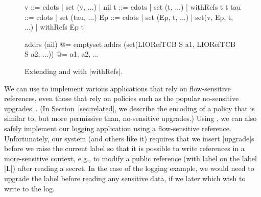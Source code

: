 \begin{figure} %
\small
\begin{code}
v    ::= cdots  | set (v, ...) | nil
t    ::= cdots  | set (t, ...) | withRefs t t
tau  ::= cdots  | set (tau, ...)
Ep   ::= cdots  | set (Ep, t, ...) | set(v, Ep, t, ...) | withRefs Ep t 

addrs (nil)                                       @= emptyset
addrs (set(LIORefTCB S a1, LIORefTCB S a2, ...))  @= {a1, a2, ...}
\end{code}
\caption{Extending \liofs{} and \lioafs{} with |withRefs|.\label{fig:sos:withRefs}}
\end{figure}

We can use \liofs{} to implement various applications that rely on
flow-sensitive references, even those that rely on policies such as the
popular no-sensitive upgrades~\cite{Austin:Flanagan:PLAS09}.
%
(In Section~\ref{sec:related}, we describe the encoding of a policy that is
similar to, but more permissive than, no-sensitive upgrades.)
%
Using \liofs{}, we can also safely implement our logging application using a
flow-sensitive reference.
%
Unfortunately, our system (and others like it) requires that we insert
|upgrade|s before we raise the current label so that it is possible to 
write references in a more-sensitive context, e.g., to modify a public reference
(with label on the label |L|) after reading a secret. 
%
In the case of the logging example, we would need to upgrade the label
before reading any sensitive data, if we later which wish to write to
the log.

